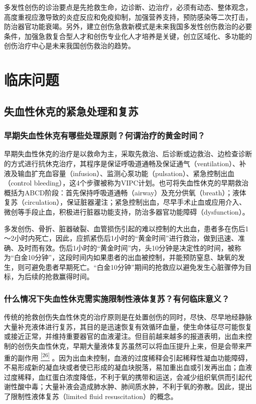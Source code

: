 多发性创伤的诊治要点是先抢救生命，边诊断、边治疗，必须有动态、整体观念，高度重视应激导致的炎症反应和免疫抑制，加强营养支持，预防感染等二次打击，防治器官功能衰竭。另外，建立创伤急救新模式是未来我国多发性创伤救治的必要条件，加强急救复合型人才和创伤专业化人才培养是关键，创立区域化、多功能的创伤治疗中心是未来我国创伤救治的趋势。

\section{临床问题}

\subsection{失血性休克的紧急处理和复苏}

\subsubsection{早期失血性休克有哪些处理原则？何谓治疗的黄金时间？}

早期失血性休克的治疗是以救命为主，采取先救治、后诊断或边救治、边检查诊断的方式进行抗休克治疗，其程序是保证呼吸道通畅及保证通气（ventilation）、补液及输血扩充血容量（infusion）、监测心泵功能（pulsation）、紧急控制出血（control
bleeding），这4个步骤被称为VIPC计划。也可将失血性休克的早期救治概括为ABCD阶段：首先保持呼吸道通畅（airway）及充分供氧（breath）；液体复苏（circulation），保证脏器灌注；紧急控制出血，尽早手术止血或应用介入、微创等手段止血，积极进行脏器功能支持，防治多器官功能障碍（dysfunction）。

多发创伤、骨折、脏器破裂、血管损伤引起的难以控制的大出血，患者多在伤后1～2小时内死亡，因此，应抓紧伤后1小时的“黄金时间”进行救治，做到迅速、准确、及时而有效。伤后1小时的“黄金时间”内，头10分钟是决定性的时间，被称为“白金10分钟”，这段时间内如果患者的出血被控制，并能预防窒息、缺氧的发生，则可避免患者早期死亡。“白金10分钟”期间的抢救应以避免发生心脏骤停为目标，为后续的抢救赢得时间。

\subsubsection{什么情况下失血性休克需实施限制性液体复苏？有何临床意义？}

传统的抢救创伤失血性休克的治疗原则是在处置创伤的同时，尽快、尽早地经静脉大量补充液体进行复苏，其目的是迅速恢复有效循环血量，使生命体征尽可能恢复或接近正常，并维持重要器官的血液灌注。但目前越来越多的报道表明，出血未控制的创伤失血性休克，早期大量液体复苏虽然可以将血压提升上来，但是会带来严重的副作用
\protect\hyperlink{text00024.htmlux5cux23ch26-23}{\textsuperscript{{[}26{]}}}
。因为出血未控制，血液的过度稀释会引起稀释性凝血功能障碍，不易形成新的凝血块或者使已形成的凝血块脱落，易加重出血或引发再出血；血液过度稀释，血红蛋白浓度降低，不利于氧的携带和运送，会减少组织氧供而引起代谢性酸中毒；大量补液会造成肺水肿、肺间质水肿，不利于氧的弥散。因此，提出了限制性液体复苏（limited
fluid resuscitation）的概念。

